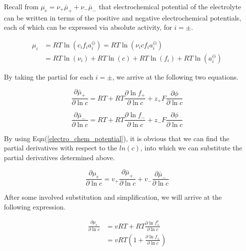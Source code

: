 \documentclass[lettersize,journal]{IEEEtran}
\begin{document}
\noindent Recall from $ \mu_{e}=\nu_{+} \bar{\mu}_{+}+\nu_{-} \bar{\mu}_{-}$ that electrochemical potential of the electrolyte can be written in terms of the positive and negative electrochemical potentials, each of which can be expressed via absolute activity, for $i = \pm$.

\begin{equation}
\begin{aligned}
\mu_{i} &=R T \ln \left(c_{i} f_{i} a_{i}^{\ominus}\right)=R T \ln \left(\nu_{i} c f_{i} a_{i}^{\ominus}\right) \\
&=R T \ln \left(\nu_{i}\right)+R T \ln (c)+R T \ln \left(f_{i}\right)+R T \ln \left(a_{i}^{\ominus}\right)
\end{aligned}
\end{equation}

\noindent By taking the partial for each $i = \pm$, we arrive at the following two equations.

\begin{equation}
\frac{\partial \bar{\mu}_{+}}{\partial \ln c}=R T+R T \frac{\partial \ln f_{+}}{\partial \ln c}+z_{+} F \frac{\partial \phi}{\partial \ln c}
\end{equation}

\begin{equation}
\frac{\partial \bar{\mu}_{-}}{\partial \ln c}=R T+R T \frac{\partial \ln f_{-}}{\partial \ln c}+z_{-} F \frac{\partial \phi}{\partial \ln c}
\end{equation}


\noindent By using Eqn(\ref{electro_chem_potential}), it is obvious that we can find the partial derivatives with respect to the $ln(c)$, into which we can substitute the partial derivatives determined above.

\begin{equation}
\frac{\partial \mu_{e}}{\partial \ln c} =v_{+} \frac{\partial \bar{\mu}_{+}}{\partial \ln c}+v_{-} \frac{\partial \bar{\mu}_{-}}{\partial \ln c}
\end{equation}

\noindent After some involved substitution and simplification, we will arrive at the following expression.

\begin{equation}
\begin{aligned}
\frac{\partial \mu_{e}}{\partial \ln c} &=v R T+R T \frac{\partial \ln f_{\pm}^{\nu}}{\partial \ln c} \\
&=v R T\left(1+\frac{\partial \ln f_{\pm}}{\partial \ln c}\right)
\end{aligned}
\end{equation}
\end{document}
